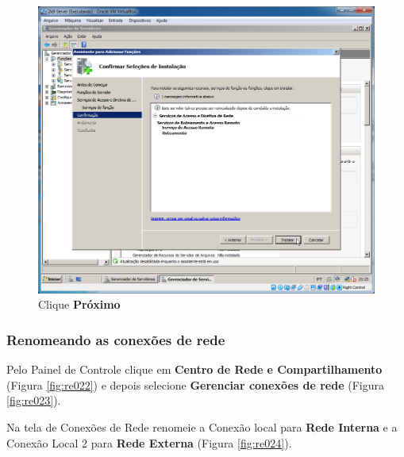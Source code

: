 \documentclass[10pt]{article}
\begin{document}
\begin{figure}[H]
    \centering
    \caption{Clique \textbf{Próximo}}
    \label{fig:re020}
    \includegraphics[width=\linewidth]{images/rede_externa/re020.png}
\end{figure}

\subsubsection{Renomeando as conexões de rede}
Pelo Painel de Controle clique em \textbf{Centro de Rede e Compartilhamento} (Figura \ref{fig:re022}) e depois selecione \textbf{Gerenciar conexões de rede} (Figura \ref{fig:re023}).
\par Na tela de Conexões de Rede renomeie a Conexão local para \textbf{Rede Interna} e a Conexão Local 2 para \textbf{Rede Externa} (Figura \ref{fig:re024}).
\end{document}
